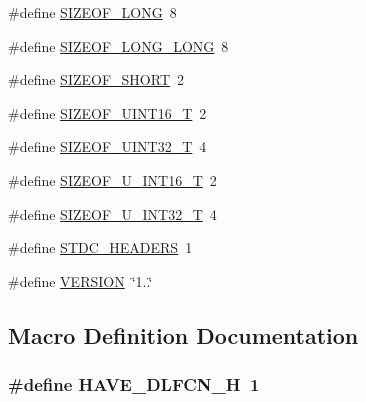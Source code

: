 \begin{DoxyCompactItemize}
\item 
\#define \hyperlink{mac_2config_2i386_2lib-src_2libogg_2config_8h_a22aece5d034fd9040a3d01c3797fdfe7}{S\+I\+Z\+E\+O\+F\+\_\+\+L\+O\+NG}~8
\item 
\#define \hyperlink{mac_2config_2i386_2lib-src_2libogg_2config_8h_acd1ddb89a6f7f17d1c152499173c3eef}{S\+I\+Z\+E\+O\+F\+\_\+\+L\+O\+N\+G\+\_\+\+L\+O\+NG}~8
\item 
\#define \hyperlink{mac_2config_2i386_2lib-src_2libogg_2config_8h_a391756f658c0bdad5fa65c4cd3410ad6}{S\+I\+Z\+E\+O\+F\+\_\+\+S\+H\+O\+RT}~2
\item 
\#define \hyperlink{mac_2config_2i386_2lib-src_2libogg_2config_8h_a58fe02491a9f85380e1bdef80a1f3b91}{S\+I\+Z\+E\+O\+F\+\_\+\+U\+I\+N\+T16\+\_\+T}~2
\item 
\#define \hyperlink{mac_2config_2i386_2lib-src_2libogg_2config_8h_a837e3fb7314e83d72198a1d03b4b5c87}{S\+I\+Z\+E\+O\+F\+\_\+\+U\+I\+N\+T32\+\_\+T}~4
\item 
\#define \hyperlink{mac_2config_2i386_2lib-src_2libogg_2config_8h_aec5778a4d0f5cb9b62cdba5453af7e12}{S\+I\+Z\+E\+O\+F\+\_\+\+U\+\_\+\+I\+N\+T16\+\_\+T}~2
\item 
\#define \hyperlink{mac_2config_2i386_2lib-src_2libogg_2config_8h_a7ec644f3871316b23b9ad0d5caec50c8}{S\+I\+Z\+E\+O\+F\+\_\+\+U\+\_\+\+I\+N\+T32\+\_\+T}~4
\item 
\#define \hyperlink{mac_2config_2i386_2lib-src_2libogg_2config_8h_a550e5c272cc3cf3814651721167dcd23}{S\+T\+D\+C\+\_\+\+H\+E\+A\+D\+E\+RS}~1
\item 
\#define \hyperlink{mac_2config_2i386_2lib-src_2libogg_2config_8h_a1c6d5de492ac61ad29aec7aa9a436bbf}{V\+E\+R\+S\+I\+ON}~\char`\"{}1..\char`\"{}
\end{DoxyCompactItemize}


\subsection{Macro Definition Documentation}
\subsubsection[{\texorpdfstring{H\+A\+V\+E\+\_\+\+D\+L\+F\+C\+N\+\_\+H}{HAVE_DLFCN_H}}]{\setlength{\rightskip}{0pt plus 5cm}\#define H\+A\+V\+E\+\_\+\+D\+L\+F\+C\+N\+\_\+H~1}\hypertarget{mac_2config_2i386_2lib-src_2libogg_2config_8h_a0ee1617ff2f6885ef384a3dd46f9b9d7}{}\label{mac_2config_2i386_2lib-src_2libogg_2config_8h_a0ee1617ff2f6885ef384a3dd46f9b9d7}


